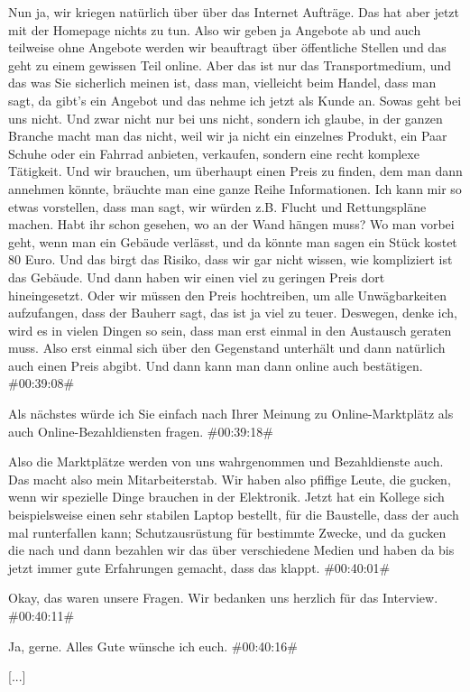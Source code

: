 \documentclass[a4paper, 12pt]{scrartcl}
\begin{document}
\begin{description}
\Andre Nun ja, wir kriegen natürlich über über das Internet Aufträge. Das hat aber jetzt mit der Homepage nichts zu tun. Also wir geben ja Angebote ab und auch teilweise ohne Angebote werden wir beauftragt über öffentliche Stellen und das geht zu einem gewissen Teil online. Aber das ist nur das Transportmedium, und das was Sie sicherlich meinen ist, dass man, vielleicht beim Handel, dass man sagt, da gibt's ein Angebot und das nehme ich jetzt als Kunde an. Sowas geht bei uns nicht. Und zwar nicht nur bei uns nicht, sondern ich glaube, in der ganzen Branche macht man das nicht, weil wir ja nicht ein einzelnes Produkt, ein Paar Schuhe oder ein Fahrrad anbieten, verkaufen, sondern eine recht komplexe Tätigkeit. Und wir brauchen, um überhaupt einen Preis zu finden, dem man dann annehmen könnte, bräuchte man eine ganze Reihe Informationen. Ich kann mir so etwas vorstellen, dass man sagt, wir würden z.B. Flucht und Rettungspläne machen. Habt ihr schon gesehen, wo an der Wand hängen muss? Wo man vorbei geht, wenn man ein Gebäude verlässt, und da könnte man sagen ein Stück kostet 80 Euro. Und das birgt das Risiko, dass wir gar nicht wissen, wie kompliziert ist das Gebäude. Und dann haben wir einen viel zu geringen Preis dort hineingesetzt. Oder wir müssen den Preis hochtreiben, um alle Unwägbarkeiten aufzufangen, dass der Bauherr sagt, das ist ja viel zu teuer. Deswegen, denke ich, wird es in vielen Dingen so sein, dass man erst einmal in den Austausch geraten muss. Also erst einmal sich über den Gegenstand unterhält und dann natürlich auch einen Preis abgibt. Und dann kann man dann online auch bestätigen. \#00:39:08\#

\Toni Als nächstes würde ich Sie einfach nach Ihrer Meinung zu Online-Marktplätz als auch Online-Bezahldiensten fragen. \#00:39:18\#

\Andre Also die Marktplätze werden von uns wahrgenommen und Bezahldienste auch. Das macht also mein Mitarbeiterstab. Wir haben also pfiffige Leute, die gucken, wenn wir spezielle Dinge brauchen in der Elektronik. Jetzt hat ein Kollege sich beispielsweise einen sehr stabilen Laptop bestellt, für die Baustelle, dass der auch mal runterfallen kann; Schutzausrüstung für bestimmte Zwecke, und da gucken die nach und dann bezahlen wir das über verschiedene Medien und haben da bis jetzt immer gute Erfahrungen gemacht, dass das klappt. \#00:40:01\#

\Fabian Okay, das waren unsere Fragen. Wir bedanken uns herzlich für das Interview. \#00:40:11\#

\Andre Ja, gerne. Alles Gute wünsche ich euch. \#00:40:16\#

[...]

\end{description}
\end{document}
